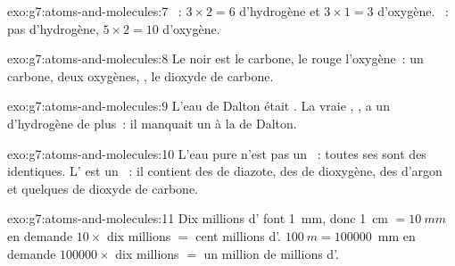\begin{solution}{exo:g7:atoms-and-molecules:7}
~: $3\times 2 = 6$  d'hydrogène et $3\times 1 = 3$ 
d'oxygène. ~: pas d'hydrogène, $5\times 2 = 10$  d'oxygène.
\end{solution}

\begin{solution}{exo:g7:atoms-and-molecules:8}
Le noir est le carbone, le rouge l'oxygène~: un carbone, deux oxygènes,
, le dioxyde de carbone.
\end{solution}

\begin{solution}{exo:g7:atoms-and-molecules:9}
L'eau de Dalton était . La vraie , , a un 
d'hydrogène de plus~: il manquait un  à la  de Dalton.
\end{solution}

\begin{solution}{exo:g7:atoms-and-molecules:10}
L'eau pure n'est pas un ~: toutes ses  sont des
  identiques. L' est un ~: il contient des
 de diazote, des  de dioxygène, des  d'argon et
quelques  de dioxyde de carbone.
\end{solution}

\begin{solution}{exo:g7:atoms-and-molecules:11}
Dix millions d' font \qty{1}{mm}, donc \qty{1}{cm} $= \qty{10}{mm}$
en demande $10 \times$ dix millions $=$ cent millions d'.
$\qty{100}{m} = \num{100000}$~mm en demande $\num{100000}\times$ dix
millions $=$ un million de millions d'.
\end{solution}

